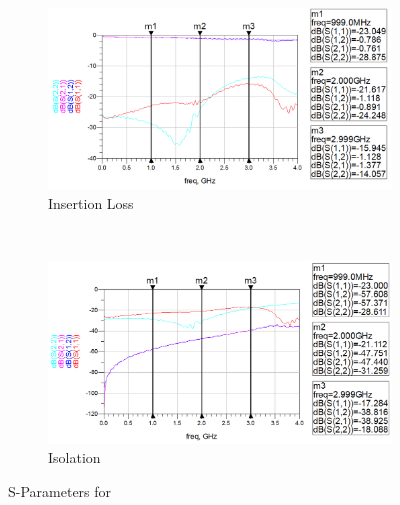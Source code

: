 \documentclass[12pt,openany,a4paper]{book}
\begin{document}
\subsubsection{\emswitch}
\begin{figure}[H]
    \centering
    \begin{subfigure}[t]{0.5\textwidth}
        \centering
        \includegraphics[width=1\textwidth]{eval-emr.png}
        \caption{Insertion Loss}
        \label{fig:eval-pe42441}
    \end{subfigure}%
    ~ 
    \begin{subfigure}[t]{0.5\textwidth}
        \centering
        \includegraphics[width=1\textwidth]{eval-emr-closed.png}
        \caption{Isolation}
    \end{subfigure}
    \caption{S-Parameters for \emswitch}
\end{figure}
\end{document}
